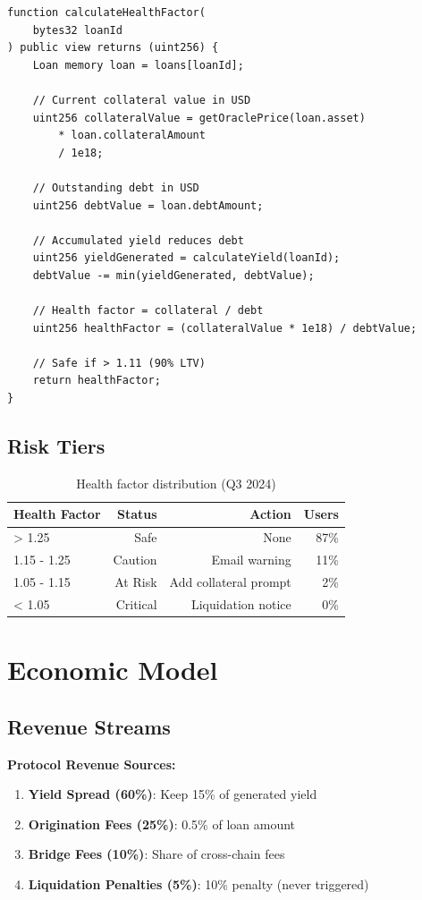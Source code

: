 \documentclass[11pt,a4paper]{article}
\begin{document}
\begin{lstlisting}[language=Solidity, basicstyle=\small\ttfamily]
function calculateHealthFactor(
    bytes32 loanId
) public view returns (uint256) {
    Loan memory loan = loans[loanId];
    
    // Current collateral value in USD
    uint256 collateralValue = getOraclePrice(loan.asset) 
        * loan.collateralAmount 
        / 1e18;
    
    // Outstanding debt in USD
    uint256 debtValue = loan.debtAmount;
    
    // Accumulated yield reduces debt
    uint256 yieldGenerated = calculateYield(loanId);
    debtValue -= min(yieldGenerated, debtValue);
    
    // Health factor = collateral / debt
    uint256 healthFactor = (collateralValue * 1e18) / debtValue;
    
    // Safe if > 1.11 (90% LTV)
    return healthFactor;
}
\end{lstlisting}

\subsection{Risk Tiers}

\begin{table}[h]
\centering
\begin{tabular}{@{}lrrr@{}}
\toprule
\textbf{Health Factor} & \textbf{Status} & \textbf{Action} & \textbf{Users} \\ \midrule
> 1.25 & Safe & None & 87\% \\
1.15 - 1.25 & Caution & Email warning & 11\% \\
1.05 - 1.15 & At Risk & Add collateral prompt & 2\% \\
< 1.05 & Critical & Liquidation notice & 0\% \\ \bottomrule
\end{tabular}
\caption{Health factor distribution (Q3 2024)}
\end{table}

\section{Economic Model}

\subsection{Revenue Streams}

\textbf{Protocol Revenue Sources:}
\begin{enumerate}
\item \textbf{Yield Spread (60\%)}: Keep 15\% of generated yield
\item \textbf{Origination Fees (25\%)}: 0.5\% of loan amount
\item \textbf{Bridge Fees (10\%)}: Share of cross-chain fees
\item \textbf{Liquidation Penalties (5\%)}: 10\% penalty (never triggered)
\end{enumerate}
\end{document}
